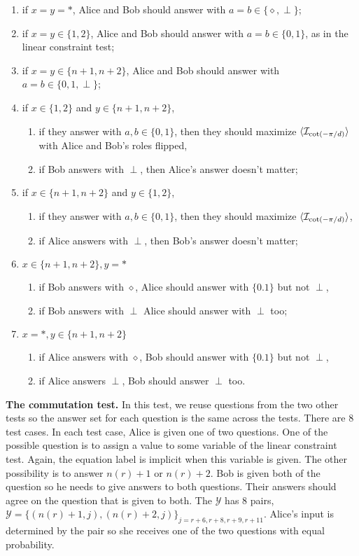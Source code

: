 \documentclass[11pt,letterpaper]{article}
\DeclarePairedDelimiter{\ip}{\langle}{\rangle}
\newcommand{\calY}{\mathcal{Y}}
\newcommand{\1}{\mathbb{1}}
\newcommand{\nr}{n(r)}
\newcommand{\I}{\mathcal{I}}
\theoremstyle{definition}
\begin{document}
\begin{enumerate}
	\item if $x = y = \ast$, Alice and Bob should answer with $a = b \in \{\diamond, \perp\}$;
	\item if $x = y \in \{1,2\}$, Alice and Bob should answer with $a = b \in \{0, 1\}$, as in the linear constraint test;
	\item if $x = y \in \{n+1, n+2\}$, Alice and Bob should answer with $a = b \in \{0, 1, \perp\}$;
	\item if $x \in \{1,2\}$ and $y \in \{n+1, n+2\}$, 
		\begin{enumerate}
		\item if they answer with $a,b \in \{0,1\}$, then
	they should maximize $\ip{\I_{\cot(-\pi/d)}}$ with Alice and Bob's roles flipped, 
		\item if Bob answers with $\perp$, then Alice's answer doesn't matter;
		\end{enumerate}
	\item if $x \in \{n+1, n+2\}$ and $y \in \{1,2\}$,
	\begin{enumerate} 
		\item if they answer with $a,b \in \{0,1\}$, then
		they should maximize $\ip{\I_{\cot(-\pi/d)}}$, 
		\item if Alice answers with $\perp$, then Bob's answer doesn't matter;
	\end{enumerate}
	\item $x \in \{n+1,n+2\}, y = \ast$ 
		\begin{enumerate}
		\item if Bob answers with $\diamond$, Alice should answer with $\{0.1\}$ but not $\perp$, 
		\item if Bob answers with $\perp$ Alice should answer with $\perp$ too;
		\end{enumerate}
	\item $x = \ast, y \in \{n+1, n+2\}$
	\begin{enumerate}
		\item if Alice answers with $\diamond$, Bob should answer with $\{0.1\}$ but not $\perp$, 
		\item if Alice answers $\perp$, Bob should answer $\perp$ too.
	\end{enumerate}
\end{enumerate}

\textbf{The commutation test.}
In this test, we reuse questions from the two other tests so the answer
set for each question is the same across the tests.
There are $8$ test cases.
In each test case, Alice is given one of two questions.
One of the possible question is to assign a value to some variable of the linear constraint test.
Again, the equation label is implicit when this variable is given.
The other possibility is to answer $\nr+1$ or $\nr+2$.
Bob is given both of the question so he needs to give answers to both questions.
Their answers should agree on the question that is given to both.
The $\calY$ has $8$ pairs, $\calY = \{ (\nr+1, j), (\nr+2, j) \}_{j = r+6, r+8, r+9, r+11}$.
Alice's input is determined by the pair so she receives one of the two questions with equal probability.
\end{document}
